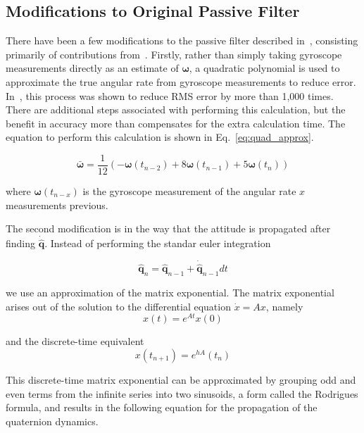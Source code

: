\documentclass[paper=a4, fontsize=11pt]{scrartcl} %
\numberwithin{equation}{section} %
\numberwithin{figure}{section} %
\numberwithin{table}{section} %
\begin{document}
\subsection{Modifications to Original Passive Filter}
There have been a few modifications to the passive filter described in~\cite{Mahony2007}, consisting primarily of contributions from~\cite{Casey2013}.  Firstly, rather than simply taking gyroscope measurements directly as an estimate of $\bm{\omega}$, a quadratic polynomial is used to approximate the true angular rate from gyroscope measurements to reduce error.  In~\cite{Casey2013}, this process was shown to reduce RMS error by more than 1,000 times.  There are additional steps associated with performing this calculation, but the benefit in accuracy more than compensates for the extra calculation time.  The equation to perform this calculation is shown in Eq.~\ref{eq:quad_approx}.

\begin{equation}
	\bar{\bm{\omega}} = \frac{1}{12}\left(-\bm{\omega}\left(t_{n-2}\right) + 8\bm{\omega}\left(t_{n-1}\right) + 5\bm{\omega}\left(t_n\right) \right)
	\label{eq:quad_approx}
\end{equation}

where $\bm{\omega}(t_{n-x})$ is the gyroscope measurement of the angular rate $x$ measurements previous.

The second modification is in the way that the attitude is propagated after finding $\bm{\dot{\hat{q}}}$.  Instead of performing the standar euler integration

\begin{equation}
	\bm{\hat{q}}_n = \bm{\hat{q}}_{n-1}+\bm{\dot{\hat{q}}}_{n-1}dt
\end{equation}

we use an approximation of the matrix exponential.  The matrix exponential arises out of the solution to the differential equation $\dot{x} = Ax$, namely
\begin{equation}
	x(t) = e^{At} x(0)
\end{equation}

and the discrete-time equivalent
\begin{equation}
	x(t_{n+1}) = e^{hA}(t_n)
\end{equation}

This discrete-time matrix exponential can be approximated by grouping odd and even terms from the infinite series into two sinusoids, a form called the Rodrigues formula, and results in the following equation for the propagation of the quaternion dynamics.
\end{document}
